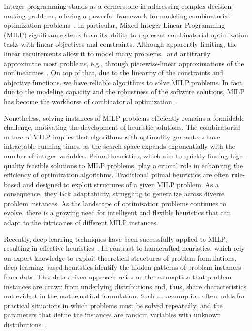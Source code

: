 Integer programming stands as a cornerstone in addressing complex decision-making problems, offering a powerful framework for modeling combinatorial optimization problems~\cite{wolseyFormulations2020}.
In particular, Mixed Integer Linear Programming (MILP) significance stems from its ability to represent combinatorial optimization tasks with linear objectives and constraints.
Although apparently limiting, the linear requirements allow it to model many problems~\cite{nemhauserScopeIntegerCombinatorial1988} and arbitrarily approximate most problems, e.g., through piecewise-linear approximations of the nonlinearities~\cite{camponogaraModelsAlgorithmsOptimal2015}.
On top of that, due to the linearity of the constraints and objective functions, we have reliable algorithms to solve MILP problems.
In fact, due to the modeling capacity and the robustness of the software solutions, MILP has become the workhorse of combinatorial optimization~\cite{bengioMachineLearningCombinatorial2021}.

Nonetheless, solving instances of MILP problems efficiently remains a formidable challenge, motivating the development of heuristic solutions.
The combinatorial nature of MILP implies that algorithms with optimality guarantees have intractable running times, as the search space expands exponentially with the number of integer variables.
Primal heuristics, which aim to quickly finding high-quality feasible solutions to MILP problems, play a crucial role in enhancing the efficiency of optimization algorithms.
Traditional primal heuristics are often rule-based and designed to exploit structures of a given MILP problem.
As a consequence, they lack adaptability, struggling to generalize across diverse problem instances.
As the landscape of optimization problems continues to evolve, there is a growing need for intelligent and flexible heuristics that can adapt to the intricacies of different MILP instances.


Recently, deep learning techniques have been successfully applied to MILP, resulting in effective heuristics~\cite{nairSolvingMixedInteger2021,gasseMachineLearningCombinatorial2022,larsenPredictingTacticalSolutions2022,khalilMIPGNNDataDrivenFramework2022,hanGNNGuidedPredictandSearchFramework2023}.
In contrast to handcrafted heuristics, which rely on expert knowledge to exploit theoretical structures of problem formulations, deep learning-based heuristics identify the hidden patterns of problem instances from data.
This data-driven approach relies on the assumption that problem instances are drawn from underlying distributions and, thus, share characteristics not evident in the mathematical formulation.
Such an assumption often holds for practical situations in which problems must be solved repeatedly, and the parameters that define the instances are random variables with unknown distributions~\cite{bengioMachineLearningCombinatorial2021}.

